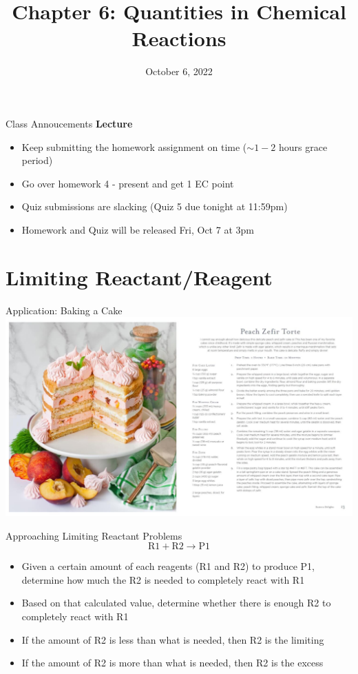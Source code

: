 \documentclass[11pt]{beamer}
\title{Chapter 6: Quantities in Chemical Reactions}
\institute{Chemistry Department, Cypress College}
\date{October 6, 2022}
\begin{document}
\begin{frame}
  \titlepage
\end{frame}

\begin{frame}{Class Annoucements}
  \textbf{Lecture}
  \begin{itemize}
  \item Keep submitting the homework assignment on time
    ($\sim 1-2$ hours grace period)
  \item Go over homework 4 - present and get 1 EC point
  \item Quiz submissions are slacking (Quiz 5 due tonight
    at 11:59pm)
  \item Homework and Quiz will be released Fri, Oct 7 at 3pm
  \end{itemize}
\end{frame}

\section{Limiting Reactant/Reagent}

\begin{frame}{Application: Baking a Cake}
  \centering
  \includegraphics[width=\linewidth]{peach_cake}
\end{frame}

\begin{frame}{Approaching Limiting Reactant Problems}
  \begin{equation}
    \text{R1} + \text{R2} \rightarrow \text{P1}
  \end{equation}
  \begin{itemize}
  \item Given a certain amount of each reagents (R1 and R2)
    to produce P1, determine
    how much the R2 is needed to completely react with R1
  \item Based on that calculated value, determine whether
    there is enough R2 to completely react with R1
  \item If the amount of R2 is less than what is needed,
    then R2 is the limiting
  \item If the amount of R2 is more than what is needed,
    then R2 is the excess
  \end{itemize}
\end{frame}
\end{document}
